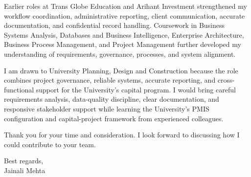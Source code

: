 \documentclass[letterpaper,10pt]{article}
\begin{document}
Earlier roles at Trans Globe Education and Arihant Investment strengthened my workflow coordination, administrative reporting, client communication, accurate documentation, and confidential record handling. Coursework in Business Systems Analysis, Databases and Business Intelligence, Enterprise Architecture, Business Process Management, and Project Management further developed my understanding of requirements, governance, processes, and system alignment.

I am drawn to University Planning, Design and Construction because the role combines project governance, reliable systems, accurate reporting, and cross-functional support for the University's capital program. I would bring careful requirements analysis, data-quality discipline, clear documentation, and responsive stakeholder support while learning the University's PMIS configuration and capital-project framework from experienced colleagues.

Thank you for your time and consideration. I look forward to discussing how I could contribute to your team.

Best regards,\\[8pt]
Jainali Mehta
\end{document}
